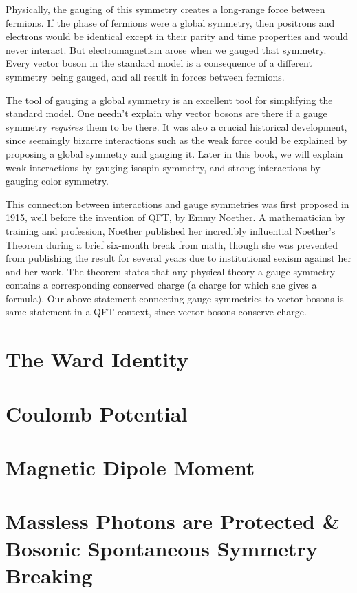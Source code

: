 Physically, the gauging of this symmetry creates a long-range force between fermions. If the phase of fermions were a global symmetry, then positrons and electrons would be identical except in their parity and time properties and would never interact. But electromagnetism arose when we gauged that symmetry. Every vector boson in the standard model is a consequence of a different symmetry being gauged, and all result in forces between fermions. 

The tool of gauging a global symmetry is an excellent tool for simplifying the standard model. One needn't explain why vector bosons are there if a gauge symmetry \textit{requires} them to be there. It was also a crucial historical development, since seemingly bizarre interactions such as the weak force could be explained by proposing a global symmetry and gauging it. Later in this book, we will explain weak interactions by gauging isospin symmetry, and strong interactions by gauging color symmetry.

This connection between interactions and gauge symmetries was first proposed in 1915, well before the invention of QFT, by Emmy Noether. A mathematician by training and profession, Noether published her incredibly influential Noether's Theorem during a brief six-month break from math, though she was prevented from publishing the result for several years due to institutional sexism against her and her work. The theorem states that any physical theory a gauge symmetry contains a corresponding conserved charge (a charge for which she gives a formula). Our above statement connecting gauge symmetries to vector bosons is same statement in a QFT context, since vector bosons conserve charge.








\section{The Ward Identity}

\section{Coulomb Potential}

\section{Magnetic Dipole Moment}

\section{Massless Photons are Protected \& Bosonic Spontaneous Symmetry Breaking}